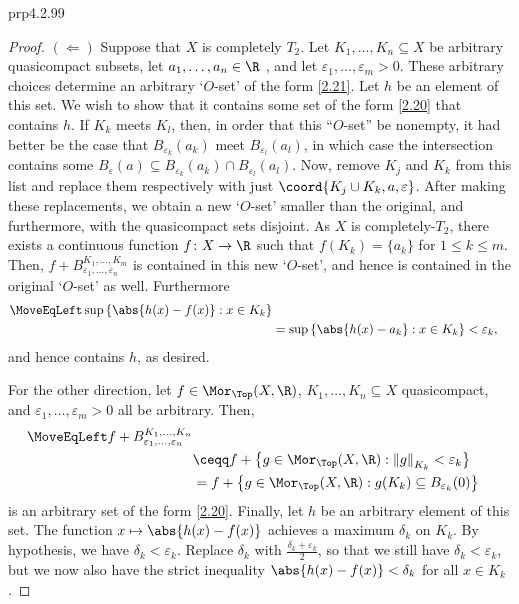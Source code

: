 \begin{prp}{}{prp4.2.99}
\begin{proof}
		\blni
		$(\Leftarrow )$ Suppose that $X$ is completely $T_2$.  Let $K_1,\ldots ,K_n\subseteq X$ be arbitrary quasicompact subsets, let $a_1,\ldots ,a_n\in \R$ , and let $\varepsilon _1,\ldots ,\varepsilon _m>0$.  These arbitrary choices determine an arbitrary `$O$-set' of the form \eqref{2.21}.  Let $h$ be an element of this set.  We wish to show that it contains some set of the form \eqref{2.20} that contains $h$.  If $K_k$ meets $K_l$, then, in order that this ``$O$-set'' be nonempty, it had better be the case that $B_{\varepsilon _k}(a_k)$ meet $B_{\varepsilon _l}(a_l)$, in which case the intersection contains some $B_{\varepsilon}(a)\subseteq B_{\varepsilon _k}(a_k)\cap B_{\varepsilon _l}(a_l)$.  Now, remove $K_j$ and $K_k$ from this list and replace them respectively with just $\coord{K_j\cup K_k,a,\varepsilon}$.   After making these replacements, we obtain a new `$O$-set' smaller than the original, and furthermore, with the quasicompact sets disjoint.  As $X$ is completely-$T_2$, there exists a continuous function $f\colon X\rightarrow \R$ such that $f(K_k)=\{ a_k\}$ for $1\leq k\leq m$.  Then, $f+B_{\varepsilon _1,\ldots ,\varepsilon _n}^{K_1,\ldots ,K_m}$ is contained in this new `$O$-set', and hence is contained in the original `$O$-set' as well.  Furthermore
		\begin{equation*}
		\begin{split}
		\MoveEqLeft
		\sup \left\{ \abs{h(x)-f(x)}:x\in K_k\right\} \\
		& =\sup \left\{ \abs{h(x)-a_k}:x\in K_k\right\} <\varepsilon _k,
		\end{split}
		\end{equation*}
		and hence contains $h$, as desired. 
		
		For the other direction, let $f\in \Mor _{\Top}(X,\R )$, $K_1,\ldots ,K_n\subseteq X$ quasicompact, and $\varepsilon _1,\ldots ,\varepsilon _m>0$ all be arbitrary.  Then,
		{\small
		\begin{equation}\label{eqn4.2.105}
			\begin{split}
				\MoveEqLeft
				f+B_{\varepsilon _1,\ldots ,\varepsilon _n}^{K_1,\ldots ,K_n} \\
				& \ceqq f+\left\{ g\in \Mor _{\Top}(X,\R ):\left\| g\right\| _{K_k}<\varepsilon _k\right\} \\
				& =f+\left\{ g\in \Mor _{\Top}(X,\R ):g(K_k)\subseteq B_{\varepsilon _k}(0)\right\} 
			\end{split}
		\end{equation}
		}
		is an arbitrary set of the form \eqref{2.20}.  Finally, let $h$ be an arbitrary element of this set.   The function $x\mapsto \abs{h(x)-f(x)}$ achieves a maximum $\delta _k$ on $K_k$.  By hypothesis, we have $\delta _k<\varepsilon _k$.  Replace $\delta _k$ with $\frac{\delta _k+\varepsilon _k}{2}$, so that we still have $\delta _k<\varepsilon _k$, but we now also have the strict inequality $\abs{h(x)-f(x)}<\delta _k$ for all $x\in K_k$.
		

\end{proof}
\end{prp}

